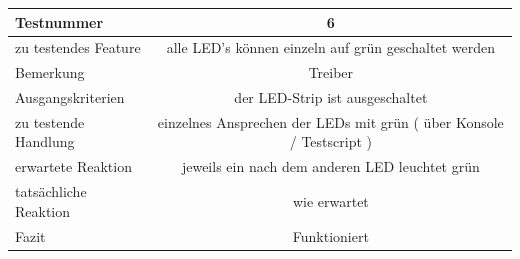 \documentclass[]{article}
\begin{document}
\begin{longtable}[]{@{}lc@{}}
\toprule
\begin{minipage}[b]{0.25\columnwidth}\raggedright\strut
Testnummer\strut
\end{minipage} & \begin{minipage}[b]{0.55\columnwidth}\centering\strut
6\strut
\end{minipage}\tabularnewline
\midrule
\endhead
\begin{minipage}[t]{0.25\columnwidth}\raggedright\strut
zu testendes Feature\strut
\end{minipage} & \begin{minipage}[t]{0.55\columnwidth}\centering\strut
alle LED's können einzeln auf grün geschaltet werden\strut
\end{minipage}\tabularnewline
\begin{minipage}[t]{0.25\columnwidth}\raggedright\strut
Bemerkung\strut
\end{minipage} & \begin{minipage}[t]{0.55\columnwidth}\centering\strut
Treiber\strut
\end{minipage}\tabularnewline
\begin{minipage}[t]{0.25\columnwidth}\raggedright\strut
Ausgangskriterien\strut
\end{minipage} & \begin{minipage}[t]{0.55\columnwidth}\centering\strut
der LED-Strip ist ausgeschaltet\strut
\end{minipage}\tabularnewline
\begin{minipage}[t]{0.25\columnwidth}\raggedright\strut
zu testende Handlung\strut
\end{minipage} & \begin{minipage}[t]{0.55\columnwidth}\centering\strut
einzelnes Ansprechen der LEDs mit grün ( über Konsole / Testscript
)\strut
\end{minipage}\tabularnewline
\begin{minipage}[t]{0.25\columnwidth}\raggedright\strut
erwartete Reaktion\strut
\end{minipage} & \begin{minipage}[t]{0.55\columnwidth}\centering\strut
jeweils ein nach dem anderen LED leuchtet grün\strut
\end{minipage}\tabularnewline
\begin{minipage}[t]{0.25\columnwidth}\raggedright\strut
tatsächliche Reaktion\strut
\end{minipage} & \begin{minipage}[t]{0.55\columnwidth}\centering\strut
wie erwartet\strut
\end{minipage}\tabularnewline
\begin{minipage}[t]{0.25\columnwidth}\raggedright\strut
Fazit\strut
\end{minipage} & \begin{minipage}[t]{0.55\columnwidth}\centering\strut
Funktioniert\strut
\end{minipage}\tabularnewline
\bottomrule
\end{longtable}
\end{document}
